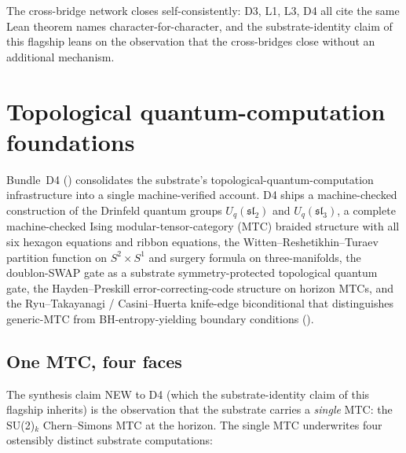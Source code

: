 \documentclass[aps,prd,reprint,nofootinbib,superscriptaddress]{revtex4-2}
\begin{document}
The cross-bridge network closes self-consistently: D3, L1, L3, D4
all cite the same Lean theorem names character-for-character, and
the substrate-identity claim of this flagship leans on the
observation that the cross-bridges close without an additional
mechanism.


\section{Topological quantum-computation foundations}
\label{sec:topological-qc}

Bundle~D4 (\cite{Roehm2026D4}) consolidates the substrate's
topological-quantum-computation infrastructure into a single
machine-verified account. D4 ships a machine-checked construction
of the Drinfeld quantum groups $U_q(\mathfrak{sl}_2)$ and
$U_q(\mathfrak{sl}_3)$, a complete machine-checked Ising
modular-tensor-category (MTC) braided structure with all six
hexagon equations and ribbon equations, the
Witten--Reshetikhin--Turaev partition function on
$S^{2}\times S^{1}$ and surgery formula on three-manifolds, the
doublon-SWAP gate as a substrate symmetry-protected
topological quantum gate, the Hayden--Preskill error-correcting-code
structure on horizon MTCs, and the Ryu--Takayanagi /
Casini--Huerta knife-edge biconditional that distinguishes
generic-MTC from BH-entropy-yielding boundary conditions
(\cite{ReshetikhinTuraev1991,Witten1989,
NayakSimonSternFreedmanDasSarma2008,FreedmanLarsenWang2002,Kitaev2003,
HaydenPreskill2007,WalkerWang2012,PastawskiYoshidaHarlowPreskill2015}).

\subsection{One MTC, four faces}

The synthesis claim NEW to D4 (which the substrate-identity claim
of this flagship inherits) is the observation that the substrate
carries a \emph{single} MTC: the SU(2)$_k$ Chern--Simons MTC at the
horizon. The single MTC underwrites four ostensibly distinct
substrate computations:
\end{document}
